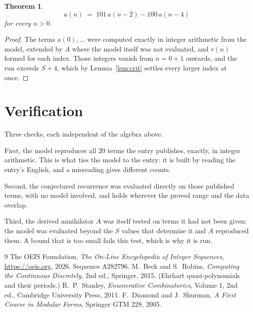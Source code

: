 \documentclass[11pt,a4paper]{article}
\theoremstyle{plain}
\newtheorem{theorem}{Theorem}
\theoremstyle{definition}
\begin{document}
\begin{theorem}
\[
a(n)\;=\;101\,a(n-2) - 100\,a(n-4)
\]
for every $n>0$.
\end{theorem}

\begin{proof}
The terms $a(0),\dots$ were computed exactly in integer arithmetic from the model, extended by
$A$ where the model itself was not evaluated, and $r(n)$ formed for each index. Those integers
vanish from $n=0+1$ onwards, and the run exceeds $S+4$, which by
Lemma~\ref{lem:crit} settles every larger index at once.
\end{proof}

\section{Verification}

Three checks, each independent of the algebra above.

First, the model reproduces all $20$ terms the entry publishes, exactly, in integer
arithmetic. This is what ties the model to the entry: it is built by reading the entry's
English, and a misreading gives different counts.

Second, the conjectured recurrence was evaluated directly on those published terms, with no
model involved, and holds wherever the proved range and the data overlap.

Third, the derived annihilator $A$ was itself tested on terms it had not been given: the model
was evaluated beyond the $S$ values that determine it and $A$ reproduced them. A bound that is
too small fails this test, which is why it is run.

\begin{thebibliography}{9}
 The OEIS Foundation, \emph{The On-Line Encyclopedia of Integer
Sequences}, \url{https://oeis.org}, 2026. Sequence A282796.
 M.~Beck and S.~Robins, \emph{Computing the Continuous Discretely},
2nd ed., Springer, 2015. (Ehrhart quasi-polynomials and their periods.)
 R.~P.~Stanley, \emph{Enumerative Combinatorics}, Volume 1, 2nd ed.,
Cambridge University Press, 2011.
 F.~Diamond and J.~Shurman, \emph{A First Course in Modular Forms},
Springer GTM 228, 2005.
\end{thebibliography}
\end{document}
